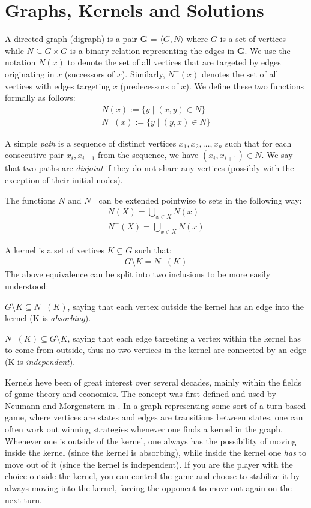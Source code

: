 \section{Graphs, Kernels and Solutions}
\label{sec:Graphs, Kernels and Solution}
A directed graph (digraph) is a pair \textbf{G} = $\langle G,N \rangle$ where $G$ is a set of vertices while $N \subseteq G \times G$ is a binary relation representing the edges in \textbf{G}.
We use the notation $N(x)$ to denote the set of all vertices that are targeted by edges originating in $x$ (successors of $x$).
Similarly, $N^-(x)$ denotes the set of all vertices with edges targeting $x$ (predecessors of $x$).
We define these two functions formally as follows:
\begin{align}
  N(x) := \{y \;|\; (x,y) \in N\}\\
  N^-(x) := \{ y \;|\; (y,x) \in N \}
\end{align}

A simple \textit{path} is a sequence of distinct vertices $x_1,x_2,\dots,x_n$ such that for each consecutive pair $x_i,x_{i+1}$ from the sequence, we have $(x_i, x_{i+1}) \in N$.
We say that two paths are \textit{disjoint} if they do not share any vertices (possibly with the exception of their initial nodes).

The functions $N$ and $N^-$ can be extended pointwise to sets in the following way:
\begin{align}
  N(X) = \bigcup_{x \in X} N(x)\\
  N^-(X) = \bigcup_{x \in X} N(x)
\end{align}

A kernel is a set of vertices $K \subseteq G$ such that:
\begin{align}
  G \setminus K = N^-(K)
\end{align}
The above equivalence can be split into two inclusions to be more easily understood:

$G \setminus K \subseteq N^-(K)$, saying that each vertex outside the kernel has an edge into the kernel (K is \textit{absorbing}).

$N^-(K) \subseteq G \setminus K$, saying that each edge targeting a vertex within the kernel has to come from outside, thus no two vertices in the kernel are connected by an edge (K is \textit{independent}).

Kernels heve been of great interest over several decades, mainly within the fields of game theory and economics.
The concept was first defined and used by Neumann and Morgenstern in \cite{neumann}.
In a graph representing some sort of a turn-based game, where vertices are states and edges are transitions between states, one can often work out winning strategies whenever one finds a kernel in the graph.
Whenever one is outside of the kernel, one always has the possibility of moving inside the kernel (since the kernel is absorbing), while inside the kernel one \textit{has} to move out of it (since the kernel is independent).
If you are the player with the choice outside the kernel, you can control the game and choose to stabilize it by always moving into the kernel, forcing the opponent to move out again on the next turn.

